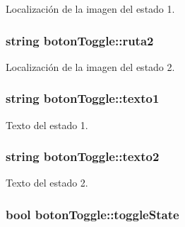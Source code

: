 Localización de la imagen del estado 1. 

\hypertarget{classboton_toggle_a29e4c1705e45c20f62a77176b7b2ae2d}{}
\subsubsection[{ruta2}]{\setlength{\rightskip}{0pt plus 5cm}string boton\+Toggle\+::ruta2\hspace{0.3cm}{\ttfamily [private]}}\label{classboton_toggle_a29e4c1705e45c20f62a77176b7b2ae2d}


Localización de la imagen del estado 2. 

\hypertarget{classboton_toggle_abd3f33fb266429ad6697518506bedce8}{}
\subsubsection[{texto1}]{\setlength{\rightskip}{0pt plus 5cm}string boton\+Toggle\+::texto1\hspace{0.3cm}{\ttfamily [private]}}\label{classboton_toggle_abd3f33fb266429ad6697518506bedce8}


Texto del estado 1. 

\hypertarget{classboton_toggle_a838680f64548815ecac688f7bd3cb59c}{}
\subsubsection[{texto2}]{\setlength{\rightskip}{0pt plus 5cm}string boton\+Toggle\+::texto2\hspace{0.3cm}{\ttfamily [private]}}\label{classboton_toggle_a838680f64548815ecac688f7bd3cb59c}


Texto del estado 2. 

\hypertarget{classboton_toggle_a16e1fc2e8c6b3bfc76f1de28f9623740}{}
\subsubsection[{toggle\+State}]{\setlength{\rightskip}{0pt plus 5cm}bool boton\+Toggle\+::toggle\+State\hspace{0.3cm}{\ttfamily [private]}}\label{classboton_toggle_a16e1fc2e8c6b3bfc76f1de28f9623740}


